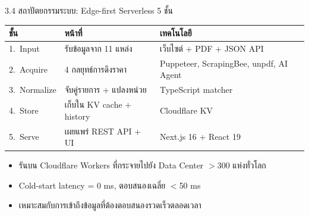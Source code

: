\documentclass[aspectratio=169,11pt]{beamer}
\begin{document}
\begin{frame}{3.4 สถาปัตยกรรมระบบ: Edge-first Serverless 5 ชั้น}
  \footnotesize
  \begin{table}
    \centering
    \begin{tabularx}{\textwidth}{l X X}
      \toprule
      \textbf{ชั้น} & \textbf{หน้าที่} & \textbf{เทคโนโลยี} \\
      \midrule
      1.\ Input     & รับข้อมูลจาก 11 แหล่ง          & เว็บไซต์ + PDF + JSON API \\
      2.\ Acquire   & 4 กลยุทธ์การดึงราคา            & Puppeteer, ScrapingBee, unpdf, AI Agent \\
      3.\ Normalize & จับคู่รายการ + แปลงหน่วย      & TypeScript matcher \\
      4.\ Store     & เก็บใน KV cache + history     & Cloudflare KV \\
      5.\ Serve     & เผยแพร่ REST API + UI         & Next.js 16 + React 19 \\
      \bottomrule
    \end{tabularx}
  \end{table}
  \begin{itemize}
    \item รันบน Cloudflare Workers ที่กระจายไปยัง Data Center $>$300 แห่งทั่วโลก
    \item Cold-start latency = 0 ms, ตอบสนองเฉลี่ย $<$50 ms
    \item เหมาะสมกับการเข้าถึงข้อมูลที่ต้องตอบสนองรวดเร็วตลอดเวลา
  \end{itemize}
\end{frame}
\end{document}
